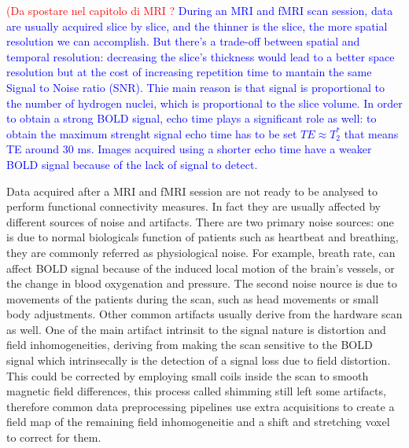 \documentclass[11pt]{report}
\begin{document}
\textcolor{red}{(Da spostare nel capitolo di MRI ?} \textcolor{blue}{ During an MRI and fMRI scan session, data are usually acquired slice by slice, and the thinner is the slice, the more spatial resolution we can accomplish.
But there's a trade-off between spatial and temporal resolution: decreasing the slice's thickness would lead to a better space resolution but at the cost of increasing repetition time to mantain the same Signal to Noise ratio (SNR).
Thie main reason is that signal is proportional to the number of hydrogen nuclei, which is proportional to the slice volume.
In order to obtain a strong BOLD signal, echo time plays a significant role as well: to obtain the maximum strenght signal echo time has to be set $TE \approx T_2^{\ast}$ that means TE around 30 ms.
Images acquired using a shorter echo time have a weaker BOLD signal because of the lack of signal to detect. \cite{jenkinson2018}
}

Data acquired after a MRI and fMRI session are not ready to be analysed to perform functional connectivity measures. In fact they are usually affected by different sources of noise and artifacts.
There are two primary noise sources: one is due to normal biologicals function of patients such as heartbeat and breathing, they are commonly referred as physiological noise. For example, breath rate, can affect BOLD signal because of the induced local motion of the brain's vessels, or the change in blood oxygenation and pressure. The second noise nource is due to movements of the patients during the scan, such as head movements or small body adjustments.
Other common artifacts usually derive from the hardware scan as well.
One of the main artifact intrinsit to the signal nature is distortion and field inhomogeneities, deriving from making the scan sensitive to the BOLD signal which intrinsecally is the detection of a signal loss due to field distortion.
This could be corrected by employing small coils inside the scan to smooth magnetic field differences, this process called shimming still left some artifacts, therefore common data preprocessing pipelines use extra acquisitions to create a field map of the remaining field inhomogeneitie and a shift and stretching voxel to correct for them.\cite{bijsterbosch2017}
\end{document}
